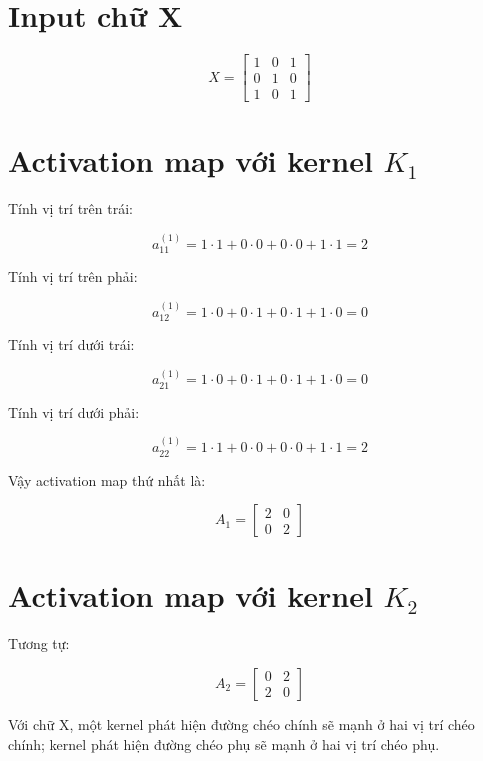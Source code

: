 \documentclass[12pt,a4paper]{report}
\begin{document}
\section{Input chữ X}

\[
    X =
    \begin{bmatrix}
    1 & 0 & 1\\
    0 & 1 & 0\\
    1 & 0 & 1
    \end{bmatrix}
\]

\section{Activation map với kernel $K_1$}

Tính vị trí trên trái:

\[
    a_{11}^{(1)}
    =
    1\cdot1
    +
    0\cdot0
    +
    0\cdot0
    +
    1\cdot1
    =
    2
\]

Tính vị trí trên phải:

\[
    a_{12}^{(1)}
    =
    1\cdot0
    +
    0\cdot1
    +
    0\cdot1
    +
    1\cdot0
    =
    0
\]

Tính vị trí dưới trái:

\[
    a_{21}^{(1)}
    =
    1\cdot0
    +
    0\cdot1
    +
    0\cdot1
    +
    1\cdot0
    =
    0
\]

Tính vị trí dưới phải:

\[
    a_{22}^{(1)}
    =
    1\cdot1
    +
    0\cdot0
    +
    0\cdot0
    +
    1\cdot1
    =
    2
\]

Vậy activation map thứ nhất là:

\[
    A_1 =
    \begin{bmatrix}
    2 & 0\\
    0 & 2
    \end{bmatrix}
\]

\section{Activation map với kernel $K_2$}

Tương tự:

\[
    A_2 =
    \begin{bmatrix}
    0 & 2\\
    2 & 0
    \end{bmatrix}
\]

\begin{ghinho}
Với chữ X, một kernel phát hiện đường chéo chính sẽ mạnh ở hai vị trí chéo chính; kernel phát hiện đường chéo phụ sẽ mạnh ở hai vị trí chéo phụ.
\end{ghinho}
\end{document}
